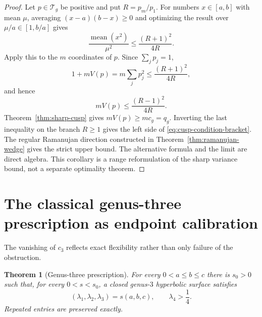 \documentclass[11pt,reqno]{amsart}
\newtheorem{theorem}{Theorem}[section]
\theoremstyle{definition}
\theoremstyle{remark}
\begin{document}
\begin{proof}
Let $p\in\mathcal T_g$ be positive and put $R=p_m/p_1$.  For numbers
$x\in[a,b]$ with mean $\mu$, averaging $(x-a)(b-x)\ge0$ and optimizing the
result over $\mu/a\in[1,b/a]$ gives
\[
 \frac{\operatorname{mean}(x^2)}{\mu^2}
 \le\frac{(R+1)^2}{4R}.
\]
Apply this to the $m$ coordinates of $p$.  Since $\sum_jp_j=1$,
\[
 1+mV(p)=m\sum_jp_j^2\le\frac{(R+1)^2}{4R},
\]
and hence
\[
 mV(p)\le\frac{(R-1)^2}{4R}.
\]
Theorem~\ref{thm:sharp-cusp} gives
$mV(p)\ge mc_g=q_g$.  Inverting the last inequality on the branch $R\ge1$
gives the left side of \eqref{eq:cusp-condition-bracket}.  The regular
Ramanujan direction constructed in Theorem~\ref{thm:ramanujan-wedge} gives
the strict upper bound.  The alternative formula and the limit are direct
algebra.  This corollary is a range reformulation of the sharp variance
bound, not a separate optimality theorem.
\end{proof}

\section{The classical genus-three prescription as endpoint calibration}
\label{sec:genus-three}

The vanishing of $c_3$ reflects exact flexibility rather than only failure of
the obstruction.

\begin{theorem}[Genus-three prescription]\label{thm:genus-three}
For every $0<a\le b\le c$ there is $s_0>0$ such that, for every
$0<s<s_0$, a closed genus-$3$ hyperbolic surface satisfies
\[
 (\lambda_1,\lambda_2,\lambda_3)=s(a,b,c),
 \qquad \lambda_4>\frac14.
\]
Repeated entries are preserved exactly.
\end{theorem}
\end{document}
